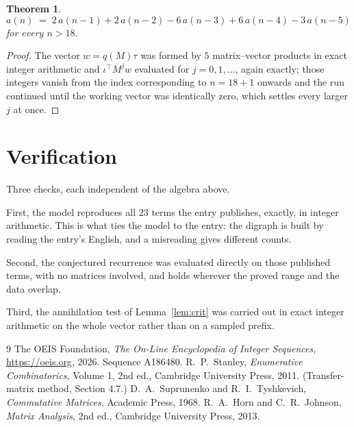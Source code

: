 \documentclass[11pt,a4paper]{article}
\theoremstyle{plain}
\newtheorem{theorem}{Theorem}
\theoremstyle{definition}
\begin{document}
\begin{theorem}
\[
a(n)\;=\;2\,a(n-1) + 2\,a(n-2) - 6\,a(n-3) + 6\,a(n-4) - 3\,a(n-5)
\]
for every $n>18$.
\end{theorem}

\begin{proof}
The vector $w=q(M)\tau$ was formed by $5$ matrix--vector products in exact integer
arithmetic and $\iota^{\!\top}M^{j}w$ evaluated for $j=0,1,\dots$, again exactly; those
integers vanish from the index corresponding to $n=18+1$ onwards and the run continued
until the working vector was identically zero, which settles every larger $j$ at once.
\end{proof}

\section{Verification}

Three checks, each independent of the algebra above.

First, the model reproduces all $23$ terms the entry publishes, exactly, in integer
arithmetic. This is what ties the model to the entry: the digraph is built by reading the
entry's English, and a misreading gives different counts.

Second, the conjectured recurrence was evaluated directly on those published terms, with no
matrices involved, and holds wherever the proved range and the data overlap.

Third, the annihilation test of Lemma~\ref{lem:crit} was carried out in exact integer
arithmetic on the whole vector rather than on a sampled prefix.

\begin{thebibliography}{9}
 The OEIS Foundation, \emph{The On-Line Encyclopedia of Integer
Sequences}, \url{https://oeis.org}, 2026. Sequence A186480.
 R.~P.~Stanley, \emph{Enumerative Combinatorics}, Volume 1, 2nd ed.,
Cambridge University Press, 2011. (Transfer-matrix method, Section 4.7.)
 D.~A.~Suprunenko and R.~I.~Tyshkevich, \emph{Commutative Matrices},
Academic Press, 1968.
 R.~A.~Horn and C.~R.~Johnson, \emph{Matrix Analysis}, 2nd ed., Cambridge
University Press, 2013.
\end{thebibliography}
\end{document}
